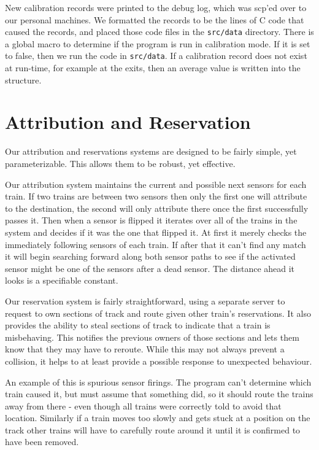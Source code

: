 \documentclass{amsart}
\begin{document}
New calibration records were printed to the debug log, which was scp'ed over to our personal machines. We formatted the records to be the lines of C code that caused the records, and placed those code files in the \texttt{src/data} directory. There is a global macro to determine if the program is run in calibration mode. If it is set to false, then we run the code in \texttt{src/data}. If a calibration record does not exist at run-time, for example at the exits, then an average value is written into the structure.

\section*{Attribution and Reservation}

Our attribution and reservations systems are designed to be fairly simple, yet
parameterizable. This allows them to be robust, yet effective.

Our attribution system maintains the current and possible next sensors for each
train. If two trains are between two sensors then only the first one will
attribute to the destination, the second will only attribute there once the
first successfully passes it. Then when a sensor is flipped it iterates over all
of the trains in the system and decides if it was the one that flipped it. At
first it merely checks the immediately following sensors of each train. If after
that it can't find any match it will begin searching forward along both sensor
paths to see if the activated sensor might be one of the sensors after a dead
sensor. The distance ahead it looks is a specifiable constant.

Our reservation system is fairly straightforward, using a separate server to
request to own sections of track and route given other train's reservations. It
also provides the ability to steal sections of track to indicate that a train is
misbehaving. This notifies the previous owners of those sections and lets them
know that they may have to reroute. While this may not always prevent a
collision, it helps to at least provide a possible response to unexpected
behaviour.

An example of this is spurious sensor firings. The program can't determine which
train caused it, but must assume that something did, so it should route the
trains away from there - even though all trains were correctly told to avoid
that location. Similarly if a train moves too slowly and gets stuck at a
position on the track other trains will have to carefully route around it until
it is confirmed to have been removed.
\end{document}
